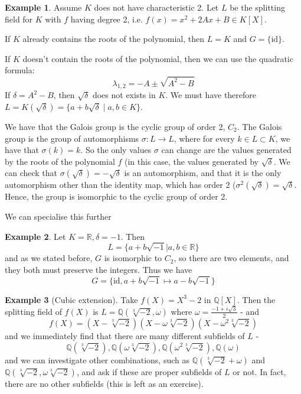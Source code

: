 \documentclass{article}
\theoremstyle{definition}
\newtheorem{exmp}{Example}[section]
\theoremstyle{plain}%
\theoremstyle{remark}
\newcommand{\R}{\mathbb{R}}
\newcommand{\Q}{\mathbb{Q}}
\begin{document}
\begin{exmp}
Assume $K$ does not have characteristic 2. Let $L$ be the splitting field for $K$ with $f$ having degree 2, i.e. $f(x) = x^2 + 2Ax + B \in K[X]$.

If $K$ already contains the roots of the polynomial, then $L = K$ and $G = \{\text{id}\}$.

If $K$ doesn't contain the roots of the polynomial, then we can use the quadratic formula: \[\lambda_{1,2} = -A \pm \sqrt{A^2 - B}\]
If $\delta = A^2 - B$, then $\sqrt{\delta}$ does not exists in $K$. We must have therefore $L = K(\sqrt{\delta}) = \{a + b\sqrt{\delta} \; | \; a,b \in K\}$.

We have that the Galois group is the cyclic group of order 2, $C_2$. The Galois group is the group of automorphisms $\sigma : L \to L$, where for every $k \in L \subset K$, we have that $\sigma(k) = k$. So the only values $\sigma$ can change are the values generated by the roots of the polynomial $f$ (in this case, the values generated by $\sqrt{\delta}$. We can check that $\sigma(\sqrt{\delta}) = -\sqrt{\delta}$ is an automorphism, and that it is the only automorphism other than the identity map, which has order 2 ($\sigma^2(\sqrt{\delta}) = \sqrt{\delta}$. Hence, the group is isomorphic to the cyclic group of order 2. 
\end{exmp}

We can specialise this further
\begin{exmp}
\item Let $K = \R, \delta = -1$. Then
\[ L = \{ a + b\sqrt{-1} | a, b \in \R\}\]
and as we stated before, $G$ is isomorphic to $C_2$, so there are two elements, and they both must preserve the integers. Thus we have
\[G = \{ \text{id}, a + b\sqrt{-1} \mapsto a - b\sqrt{-1} \}\]
\end{exmp}

\begin{exmp}[Cubic extension]
Take $f(X) = X^3 - 2$ in $\Q[X]$. Then the splitting field of $f(X)$ is $L = \Q(\sqrt[3]{-2}, \omega)$ where $\omega = \frac{-1 + i\sqrt{3}}{2}$ - and 
\[f(X) = (X - \sqrt[3]{-2})(X - \omega\sqrt[3]{-2})(X - \omega^2\sqrt[3]{-2})\]
and we immediately find that there are many different subfields of $L$ -
\[\Q(\sqrt[3]{-2}), \Q(\omega\sqrt[3]{-2}), \Q(\omega^2\sqrt[3]{-2}), \Q(\omega)\]
and we can investigate other combinations, such as $\Q(\sqrt[3]{-2} + \omega)$ and $\Q(\sqrt[3]{-2}, \omega\sqrt[3]{-2})$, and ask if these are proper subfields of $L$ or not. In fact, there are no other subfields (this is left as an exercise).
\end{exmp}
\end{document}
